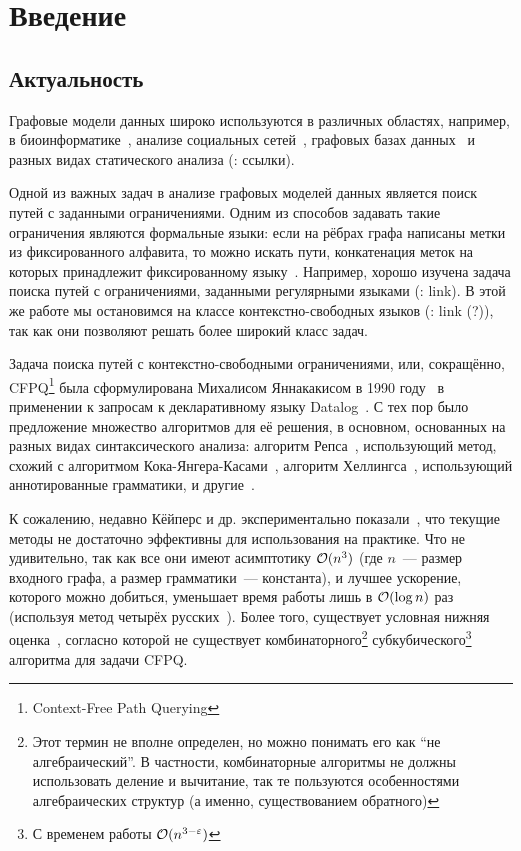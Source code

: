 \section*{Введение}


\subsection*{Актуальность}

Графовые модели данных широко используются в различных областях, например, в биоинформатике~\cite{Sevon08}, анализе социальных сетей~\cite{Zarrinkalam14, Chaudhary16}, графовых базах данных~\cite{Medeiros18,Yannakakis1990} и разных видах статического анализа (\TODO: ссылки). 

Одной из важных задач в анализе графовых моделей данных является поиск путей с заданными ограничениями. Одним из способов задавать такие ограничения являются формальные языки: если на рёбрах графа написаны метки из фиксированного алфавита, то можно искать пути, конкатенация меток на которых принадлежит фиксированному языку~\cite{Barrett00}. Например, хорошо изучена задача поиска путей с ограничениями, заданными регулярными языками (\TODO: link). В этой же работе мы остановимся на классе контекстно-свободных языков (\TODO: link (?)), так как они позволяют решать более широкий класс задач.

Задача поиска путей с контекстно-свободными ограничениями, или, сокращённо, CFPQ\footnote{Context-Free Path Querying} была сформулирована Михалисом Яннакакисом в 1990 году~\cite{Yannakakis1990} в применении к запросам к декларативному языку Datalog~\cite{DatalogWiki, Ceri1989}. С тех пор было предложение множество алгоритмов для её решения, в основном, основанных на разных видах синтаксического анализа: алгоритм Репса~\cite{Reps97}, использующий метод, схожий с алгоритмом Кока-Янгера-Касами~\cite{Younger1967},
 алгоритм Хеллингса~\cite{Hellings15}, использующий аннотированные грамматики, и другие~\cite{Santos18,Azimov18, Medeiros18, Orachev20, Chaudhuri08}. 

 К сожалению, недавно Кёйперс и др. экспериментально показали~\cite{Kuijpers19}, что текущие методы не достаточно эффективны для использования на практике. Что не удивительно, так как все они имеют асимптотику $\mathcal{O}(n^3)$ (где $n$~--- размер входного графа, а размер грамматики~--- константа), и лучшее ускорение, которого можно добиться, уменьшает время работы лишь в $\mathcal{O}(\log n)$ раз~\cite{Chaudhuri06} (используя метод четырёх русских~\cite{Arlazarov70}). Более того, существует условная нижняя оценка~\cite{Heintze1997,Chatterjee17}, согласно которой не существует комбинаторного\footnote{Этот термин не вполне определен, но можно понимать его как ``не алгебраический''. В частности, комбинаторные алгоритмы не должны использовать деление и вычитание, так те пользуются особенностями алгебраических структур (а именно, существованием обратного)} субкубического\footnote{С временем работы $\mathcal{O}(n^{3 - \varepsilon})$} алгоритма для задачи CFPQ.

